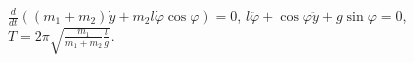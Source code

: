 $\frac{d}{dt}\left( (m_1 + m_2)\dot{y} +
m_2l\dot{\varphi}\cos{\varphi}\right) = 0$,
$l\ddot{\varphi} + \cos{\varphi\ddot{y}} + g\sin{\varphi} = 0$,
$T = 2\pi\sqrt{\frac{m_1}{m_1 + m_2}\frac{l}{g}}$.
